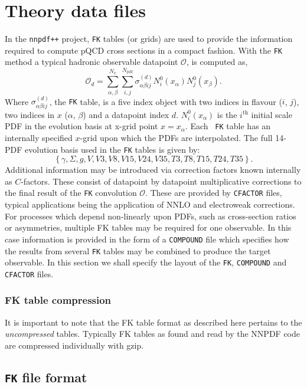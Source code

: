\documentclass[11pt]{article}
\newcommand{\be}{\begin{equation}}
\newcommand{\ee}{\end{equation}}
\begin{document}

\section{Theory data files} \label{sec:theory}
In the {\tt nnpdf++} project, {\tt FK} tables (or grids) are used to provide the
information required to compute pQCD cross sections in a compact fashion.  With
the {\tt FK} method a typical hadronic observable datapoint $\mathcal{O}$, is
computed as,
%
\be \mathcal{O}_d= \sum_{\alpha,\beta}^{N_x}\sum_{i,j}^{N_{\mathrm{pdf}}} \sigma^{(d)}_{\alpha\beta i j}N_i^0(x_\alpha)N_j^0(x_\beta). \label{eq:FKprod}\ee
%
Where $\sigma_{\alpha\beta i j}^{(d)}$, the {\tt FK} table, is a five index
object with two indices in flavour ($i$, $j$), two indices in $x$ ($\alpha$,
$\beta$) and a datapoint index $d$. $N^0_i({x_\alpha})$ is the $i^{\mathrm{th}}$
initial scale PDF in the evolution basis at x-grid point $x=x_\alpha$. Each {\tt
FK} table has an internally specified $x$-grid upon which the PDFs are
interpolated.  The full 14-PDF evolution basis used in the {\tt FK} tables is
given by:
%
\be \left\{ \gamma, \Sigma,g,V,V3,V8,V15,V24,V35,T3,T8,T15,T24,T35\right\}. \label{eq:evolbasis} \ee
%
Additional information may be introduced via correction factors known internally
as $C$-factors. These consist of datapoint by datapoint multiplicative
corrections to the final result of the {\tt FK} convolution $\mathcal{O}$. These
are provided by {\tt CFACTOR} files, typical applications being the application
of NNLO and electroweak corrections.  For processes which depend non-linearly
upon PDFs, such as cross-section ratios or asymmetries, multiple FK tables may
be required for one observable. In this case information is provided in the form
of a {\tt COMPOUND} file which specifies how the results from several {\tt FK}
tables may be combined to produce the target observable.  In this section we
shall specify the layout of the {\tt FK}, {\tt COMPOUND} and {\tt CFACTOR}
files.

\subsubsection{FK table compression}
It is important to note that the FK table format as described here pertains to
the \emph{uncompressed} tables. Typically FK tables as found and read by the
NNPDF code are compressed individually with gzip.

\subsection{{\tt FK} file format}
\end{document}
